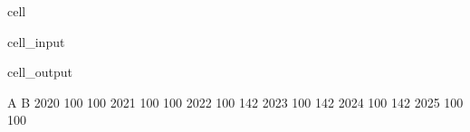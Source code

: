 \documentclass[letterpaper,10pt,english]{jupyterBook}
\begin{document}
\begin{sphinxuseclass}{cell}\begin{sphinxVerbatimInput}

\begin{sphinxuseclass}{cell_input}
\begin{sphinxVerbatim}[commandchars=\\\{\}]
\end{sphinxVerbatim}

\end{sphinxuseclass}\end{sphinxVerbatimInput}
\begin{sphinxVerbatimOutput}

\begin{sphinxuseclass}{cell_output}
\begin{sphinxVerbatim}[commandchars=\\\{\}]
        A    B
2020  100  100
2021  100  100
2022  100  142
2023  100  142
2024  100  142
2025  100  100
\end{sphinxVerbatim}

\end{sphinxuseclass}\end{sphinxVerbatimOutput}

\end{sphinxuseclass}
\end{document}

